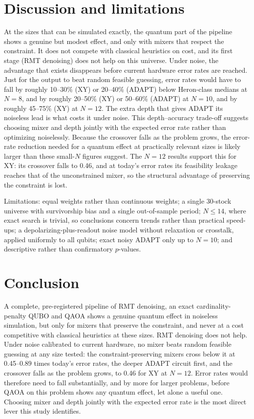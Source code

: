 \documentclass[11pt]{article}
\begin{document}
\section{Discussion and limitations}
At the sizes that can be simulated exactly, the quantum part of the pipeline shows a genuine but
modest effect, and only with mixers that respect the constraint. It does not compete with classical
heuristics on cost, and its first stage (RMT denoising) does not help on this universe.
Under noise, the advantage that exists disappears before current hardware error rates are
reached. Just for the output to beat random feasible guessing, error rates would have to fall
by roughly 10--30\% (XY) or 20--40\% (ADAPT) below Heron-class medians at $N=8$, and by roughly
20--50\% (XY) or 50--60\% (ADAPT) at $N=10$, and by roughly 45--75\% (XY) at $N=12$. The extra depth that gives ADAPT its noiseless lead
is what costs it under noise. This depth--accuracy trade-off suggests choosing mixer and depth
jointly with the expected error rate rather than optimizing noiselessly. Because the crossover
falls as the problem grows, the error-rate reduction needed for a quantum effect at practically
relevant sizes is likely larger than these small-$N$ figures suggest. The $N=12$ results support
this for XY: its crossover falls to 0.46, and at today's error rates its feasibility leakage
reaches that of the unconstrained mixer, so the structural advantage of preserving the
constraint is lost.

Limitations: equal weights rather than continuous weights; a single 30-stock universe with
survivorship bias and a single out-of-sample period; $N\le14$, where exact search is trivial, so
conclusions concern trends rather than practical speed-ups; a depolarizing-plus-readout noise model
without relaxation or crosstalk, applied uniformly to all qubits; exact noisy ADAPT only up to
$N=10$; and descriptive rather than confirmatory $p$-values.

\section{Conclusion}
A complete, pre-registered pipeline of RMT denoising, an exact cardinality-penalty QUBO and QAOA
shows a genuine quantum effect in noiseless simulation, but only for mixers that preserve the
constraint, and never at a cost competitive with classical heuristics at these sizes. RMT
denoising does not help. Under noise calibrated to current hardware, no mixer beats random
feasible guessing at any size tested: the constraint-preserving mixers cross below it at 0.45--0.89
times today's error rates, the deeper ADAPT circuit first, and the crossover falls as the problem
grows, to 0.46 for XY at $N=12$. Error rates would therefore need to fall substantially, and by
more for larger problems, before QAOA on this problem shows any quantum effect, let alone a useful
one. Choosing mixer and depth jointly with the expected error rate is the most direct lever this
study identifies.
\end{document}
